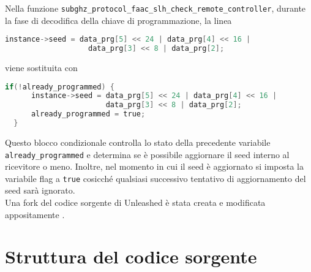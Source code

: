 Nella funzione \texttt{subghz\_protocol\_faac\_slh\_check\_remote\_controller}, durante la fase di decodifica della chiave di programmazione, la linea
\begin{lstlisting}[language=C,basicstyle=\small]
  instance->seed = data_prg[5] << 24 | data_prg[4] << 16 |
                   data_prg[3] << 8 | data_prg[2];
\end{lstlisting}
viene sostituita con
\begin{lstlisting}[language=C,basicstyle=\small]
  if(!already_programmed) {
      instance->seed = data_prg[5] << 24 | data_prg[4] << 16 |
                       data_prg[3] << 8 | data_prg[2];
      already_programmed = true;
  }
\end{lstlisting}
Questo blocco condizionale controlla lo stato della precedente variabile \texttt{already\_programmed} e determina se è possibile aggiornare il seed interno al ricevitore o meno. Inoltre, nel momento in cui il seed è aggiornato si imposta la variabile flag a \texttt{true} cosicché qualsiasi successivo tentativo di aggiornamento del seed sarà ignorato.\\
Una fork del codice sorgente di Unleashed è stata creata e modificata appositamente \cite{firmware_mod}.

\section{Struttura del codice sorgente}
\label{sec:source}

